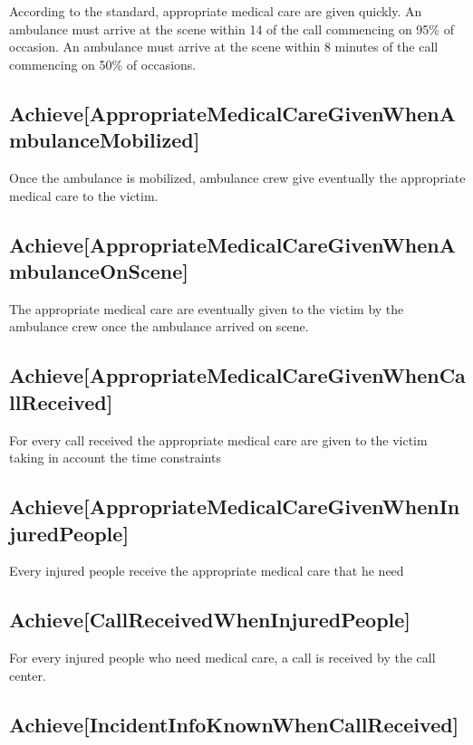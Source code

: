 According to the standard, appropriate medical care are given quickly. An ambulance must arrive at the scene within 14 of the call commencing on 95\% of occasion. An ambulance must arrive at the scene within 8 minutes of the call commencing on 50\% of occasions.


\subsection{Achieve[AppropriateMedicalCareGivenWhenAmbulanceMobilized]}

Once the ambulance is mobilized, ambulance crew  give eventually the appropriate medical care to the victim.


\subsection{Achieve[AppropriateMedicalCareGivenWhenAmbulanceOnScene]}

The appropriate medical care are eventually given to the victim by the ambulance crew once the ambulance arrived on scene.


\subsection{Achieve[AppropriateMedicalCareGivenWhenCallReceived]}

For every call received the appropriate medical care are given to the victim taking in account the time constraints


\subsection{Achieve[AppropriateMedicalCareGivenWhenInjuredPeople]}

Every injured people receive the appropriate medical care that he need


\subsection{Achieve[CallReceivedWhenInjuredPeople]}

For every injured people who need medical care, a call is received by the call center.


\subsection{Achieve[IncidentInfoKnownWhenCallReceived]}

